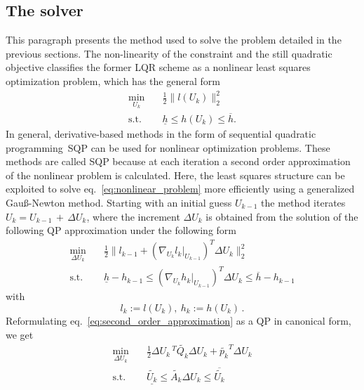 \subsection{The solver}
\label{sec:linearization}
This paragraph presents the method used to solve the problem detailed in the previous sections.
The non-linearity of the constraint and the still quadratic objective classifies the former LQR scheme as a nonlinear least squares optimization problem, which has the general form
\begin{subequations}
    \label{eq:nonlinear_problem}
    \begin{align}
        \min_{U_k}  \quad & \frac{1}{2} \lVert l(U_k) \rVert_2^2 \label{eq:nonlinear_problem_objective}\\
        \text{s.t.} \quad & \underline{h} \leq h(U_k) \leq \overline{h} \label{eq:nonlinear_problem_constraints}.
    \end{align}
\end{subequations}
In general, derivative-based methods in the form of sequential quadratic programming~{SQP} can be used for nonlinear optimization problems.
These methods are called SQP because at each iteration a second order approximation of the nonlinear problem is calculated.
Here, the least squares structure can be exploited to solve eq.~\eqref{eq:nonlinear_problem} more efficiently using a generalized Gau\ss-Newton method.
Starting with an initial guess $U_{k-1}$ the method iterates $U_{k} = U_{k-1} \,+\, \Delta U_k$,
where the increment $\Delta U_k$ is obtained from the solution of the following QP approximation under the following form
\begin{subequations}
    \label{eq:second_order_approximation}
    \begin{align}
        \min_{\Delta U_k} \quad & \frac{1}{2} \lVert l_{k-1} + (\nabla_{U_{k}} l_k|_{U_{k-1}})^T \Delta U_k \rVert_2^2 \label{eq:second_order_approximation_objective}\\
        \text{s.t.} \quad & \underline{h} - h_{k-1} \leq (\nabla_{U_{k}} h_k|_{U_{k-1}})^T \Delta U_k \leq \overline{h} - h_{k-1}
        \label{eq:second_order_approximation_inequality_constraints}
    \end{align}
\end{subequations}
with
\begin{equation*}
    l_k := l(U_k),\ h_k := h(U_k) \,.
\end{equation*}
Reformulating eq.~\eqref{eq:second_order_approximation} as a QP in canonical form, we get
\begin{subequations}
    \label{eq:final_qp}
    \begin{align}
        \min_{\Delta U_k} \quad & \frac{1}{2} \Delta U_{k}\,^T \tilde{Q_k} \Delta U_{k} + \tilde{p_k}^T \Delta U_{k} \\
        \text{s.t.}       \quad & \underline{\tilde{U_k}} \leq \tilde{A_k} \Delta U_k \leq \overline{\tilde{U_k}}
    \end{align}
\end{subequations}
